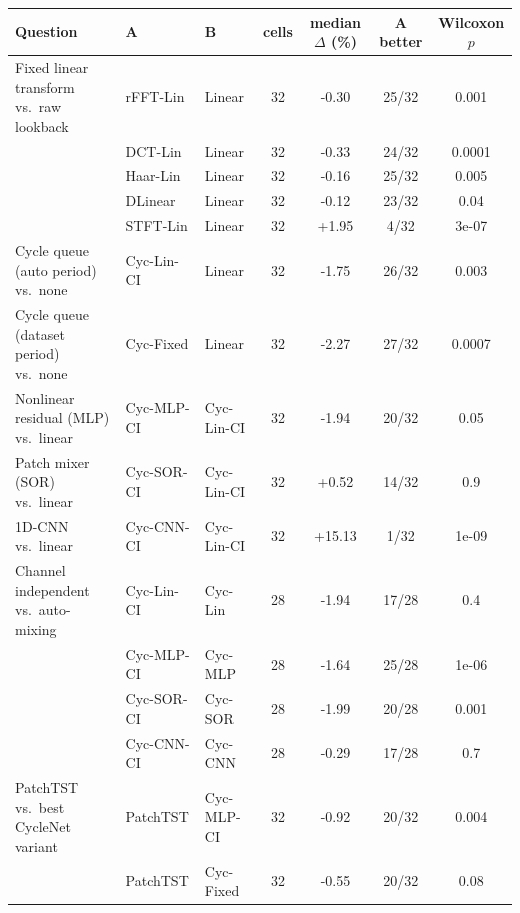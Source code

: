 \begin{tabular}{lllcccc}
\toprule
Question & A & B & cells & median $\Delta$ (\%) & A better & Wilcoxon $p$ \\
\midrule
Fixed linear transform vs.\ raw lookback & rFFT-Lin & Linear & 32 & -0.30 & 25/32 & 0.001 \\
 & DCT-Lin & Linear & 32 & -0.33 & 24/32 & 0.0001 \\
 & Haar-Lin & Linear & 32 & -0.16 & 25/32 & 0.005 \\
 & DLinear & Linear & 32 & -0.12 & 23/32 & 0.04 \\
 & STFT-Lin & Linear & 32 & +1.95 & 4/32 & 3e-07 \\
Cycle queue (auto period) vs.\ none & Cyc-Lin-CI & Linear & 32 & -1.75 & 26/32 & 0.003 \\
Cycle queue (dataset period) vs.\ none & Cyc-Fixed & Linear & 32 & -2.27 & 27/32 & 0.0007 \\
Nonlinear residual (MLP) vs.\ linear & Cyc-MLP-CI & Cyc-Lin-CI & 32 & -1.94 & 20/32 & 0.05 \\
Patch mixer (SOR) vs.\ linear & Cyc-SOR-CI & Cyc-Lin-CI & 32 & +0.52 & 14/32 & 0.9 \\
1D-CNN vs.\ linear & Cyc-CNN-CI & Cyc-Lin-CI & 32 & +15.13 & 1/32 & 1e-09 \\
Channel independent vs.\ auto-mixing & Cyc-Lin-CI & Cyc-Lin & 28 & -1.94 & 17/28 & 0.4 \\
 & Cyc-MLP-CI & Cyc-MLP & 28 & -1.64 & 25/28 & 1e-06 \\
 & Cyc-SOR-CI & Cyc-SOR & 28 & -1.99 & 20/28 & 0.001 \\
 & Cyc-CNN-CI & Cyc-CNN & 28 & -0.29 & 17/28 & 0.7 \\
PatchTST vs.\ best CycleNet variant & PatchTST & Cyc-MLP-CI & 32 & -0.92 & 20/32 & 0.004 \\
 & PatchTST & Cyc-Fixed & 32 & -0.55 & 20/32 & 0.08 \\
\bottomrule
\end{tabular}